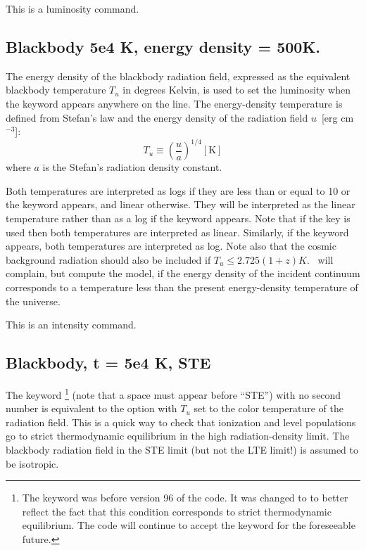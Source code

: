 This is a luminosity command.

\subsection{Blackbody 5e4 K, energy density = 500K.  }

The energy density of the blackbody radiation field, expressed as the
equivalent blackbody temperature $T_u$ in degrees Kelvin,
is used to set the
luminosity when the  keyword appears
anywhere on the line.
The energy-density temperature is defined from Stefan's law and the energy
density of the radiation field $u$~[erg cm$^{-3}$]:
\begin{equation}
T_u  \equiv \left( {\frac{u}{a}} \right)^{1/4}  [\mathrm{K}]%
\end{equation}
where $a$ is the Stefan's radiation density constant.

Both temperatures are interpreted as logs if they are less than or equal
to 10 or the keyword  appears, and linear otherwise.  They will be interpreted as the linear
temperature rather than as a log if the keyword  appears.  Note that
if the  key is used then both temperatures are interpreted as linear.
Similarly, if the keyword  appears, both temperatures are interpreted as log.
Note also that the cosmic background radiation should also be included if
$T_u\le 2.725 (1+z) K$.
\Cloudy\ will complain, but compute the model, if the
energy density of the incident continuum corresponds to a temperature less
than the present energy-density temperature of the universe.

This is an intensity command.

\subsection{Blackbody, t = 5e4 K, STE  }

The keyword \footnote{The keyword was  before version 96 of the code.  It was changed
to  to better reflect the fact that this condition corresponds to strict
thermodynamic equilibrium.
The code will continue to accept the  keyword
for the foreseeable future.}
(note that a space must appear before ``STE'') with no second number is
equivalent to the  option with $T_u$ set
to the color temperature
of the radiation field.
This is a quick way to check that ionization and
level populations go to strict thermodynamic equilibrium in the high
radiation-density limit.
The blackbody radiation field in the STE limit (but not the LTE limit!)
is assumed to be isotropic.

